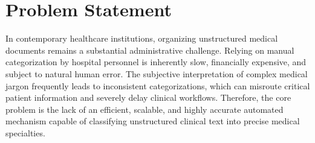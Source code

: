 \section{Problem Statement}
In contemporary healthcare institutions, organizing unstructured medical documents remains a substantial administrative challenge. Relying on manual categorization by hospital personnel is inherently slow, financially expensive, and subject to natural human error. The subjective interpretation of complex medical jargon frequently leads to inconsistent categorizations, which can misroute critical patient information and severely delay clinical workflows. Therefore, the core problem is the lack of an efficient, scalable, and highly accurate automated mechanism capable of classifying unstructured clinical text into precise medical specialties.
